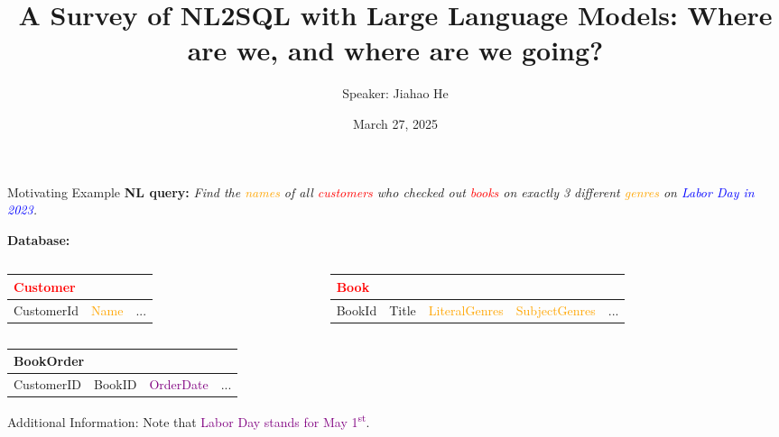\documentclass[aspectratio=169,xcolor=dvipsnames]{beamer}
\title{A Survey of NL2SQL with Large Language Models: Where are we, and where are we going?}
\author{Speaker: Jiahao He}
\institute
{
    School of Information \\
    Renmin University of China %
}
\date{March 27, 2025} %
\begin{document}
\begin{frame}
    \titlepage
\end{frame}


\begin{frame}{Motivating Example}
    \textbf{NL query: }\textit{Find the \textcolor{orange}{names} of all \textcolor{red}{customers} who checked out \textcolor{red}{books} on exactly 3 different \textcolor{orange}{genres} on \textcolor{blue}{Labor Day in 2023}.}

    \textbf{Database:}

    \begin{columns}[T]
        \begin{column}{.3\textwidth}
            \begin{table}
                \begin{tabular}{l l l}
                    \toprule
                    \multicolumn{3}{l}{\textcolor{red}{Customer}} \\
                    \midrule
                    CustomerId         & \textcolor{orange}{Name}          & ...\\
                    \bottomrule
                \end{tabular}
            \end{table}
        \end{column}

        \begin{column}{.6\textwidth}
            \begin{table}
                \begin{tabular}{l l l l l}
                    \toprule
                    \multicolumn{5}{l}{\textcolor{red}{Book}} \\
                    \midrule
                    BookId         & Title          &\textcolor{orange}{LiteralGenres} & \textcolor{orange}{SubjectGenres} & ...\\
                    \bottomrule
                \end{tabular}
            \end{table}
        \end{column}
    \end{columns}

    \begin{table}
        \begin{tabular}{l l l l}
            \toprule
            \multicolumn{4}{l}{BookOrder} \\
            \midrule
            CustomerID         & BookID          &\textcolor{purple}{OrderDate} & ...\\
            \bottomrule
        \end{tabular}
    \end{table}
    Additional Information: Note that \textcolor{purple}{Labor Day stands for May 1\textsuperscript{st}}.
\end{frame}
\end{document}
